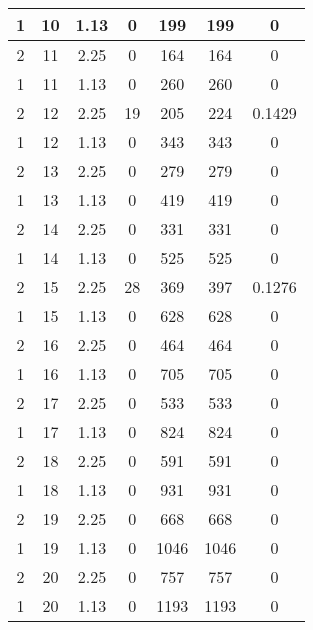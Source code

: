 \documentclass[letterpaper, 12pt]{article}
\begin{document}
\begin{longtable}{|c|c|c|c|c|c|c|}
\hline
1 & 10 & 1.13 & 0 & 199 & 199 & 0 \\
\hline
2 & 11 & 2.25 & 0 & 164 & 164 & 0 \\
\hline
1 & 11 & 1.13 & 0 & 260 & 260 & 0 \\
\hline
2 & 12 & 2.25 & 19 & 205 & 224 & 0.1429 \\
\hline
1 & 12 & 1.13 & 0 & 343 & 343 & 0 \\
\hline
2 & 13 & 2.25 & 0 & 279 & 279 & 0 \\
\hline
1 & 13 & 1.13 & 0 & 419 & 419 & 0 \\
\hline
2 & 14 & 2.25 & 0 & 331 & 331 & 0 \\
\hline
1 & 14 & 1.13 & 0 & 525 & 525 & 0 \\
\hline
2 & 15 & 2.25 & 28 & 369 & 397 & 0.1276 \\
\hline
1 & 15 & 1.13 & 0 & 628 & 628 & 0 \\
\hline
2 & 16 & 2.25 & 0 & 464 & 464 & 0 \\
\hline
1 & 16 & 1.13 & 0 & 705 & 705 & 0 \\
\hline
2 & 17 & 2.25 & 0 & 533 & 533 & 0 \\
\hline
1 & 17 & 1.13 & 0 & 824 & 824 & 0 \\
\hline
2 & 18 & 2.25 & 0 & 591 & 591 & 0 \\
\hline
1 & 18 & 1.13 & 0 & 931 & 931 & 0 \\
\hline
2 & 19 & 2.25 & 0 & 668 & 668 & 0 \\
\hline
1 & 19 & 1.13 & 0 & 1046 & 1046 & 0 \\
\hline
2 & 20 & 2.25 & 0 & 757 & 757 & 0 \\
\hline
1 & 20 & 1.13 & 0 & 1193 & 1193 & 0 \\
\hline
\end{longtable}
\end{document}
